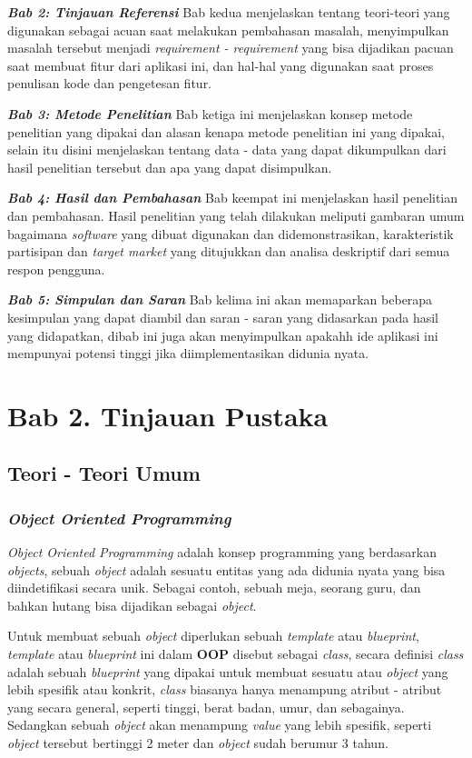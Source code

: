 \documentclass[a4paper]{article}
\newcommand{\bab}[1]{%
    \addtocounter{section}{1}%
    \setcounter{subsection}{0}
    \setcounter{subsubsection}{0}
    \setcounter{figure}{0}
    \setcounter{table}{0}
    \section*{#1}%
    \addcontentsline{toc}{section}{\protect\numberline{}#1}%
}
\newcommand{\subbab}[1]{%
    \subsection{#1}%
    \setcounter{figure}{0}
    \setcounter{table}{0}
}
\newcommand{\subsubbab}[1]{%
    \subsubsection{#1}%
}
\begin{document}
\textit{\textbf{Bab 2: Tinjauan Referensi}}\newline
Bab kedua menjelaskan tentang teori-teori yang digunakan sebagai acuan saat melakukan pembahasan masalah, menyimpulkan masalah tersebut menjadi \textit{requirement - requirement} yang bisa dijadikan pacuan saat membuat fitur dari aplikasi ini, dan hal-hal yang digunakan saat proses penulisan kode dan pengetesan fitur.

\textit{\textbf{Bab 3: Metode Penelitian}}\newline
Bab ketiga ini menjelaskan konsep metode penelitian yang dipakai dan alasan kenapa metode penelitian ini yang dipakai, selain itu disini menjelaskan tentang data - data yang dapat dikumpulkan dari hasil penelitian tersebut dan apa yang dapat disimpulkan.

\textit{\textbf{Bab 4: Hasil dan Pembahasan}}\newline
Bab keempat ini menjelaskan hasil penelitian dan pembahasan. Hasil penelitian yang telah dilakukan meliputi gambaran umum bagaimana \textit{software} yang dibuat digunakan dan didemonstrasikan, karakteristik partisipan dan \textit{target market} yang ditujukkan dan analisa deskriptif dari semua respon pengguna.

\textit{\textbf{Bab 5: Simpulan dan Saran}}\newline
Bab kelima ini akan memaparkan beberapa kesimpulan yang dapat diambil dan saran - saran yang didasarkan pada hasil yang didapatkan, dibab ini juga akan menyimpulkan apakahh ide aplikasi ini mempunyai potensi tinggi jika diimplementasikan didunia nyata.

\newpage
\bab{Bab 2. Tinjauan Pustaka}


\subbab{Teori - Teori Umum}

\subsubbab{\textit{Object Oriented Programming}}
\textit{Object Oriented Programming} adalah konsep programming yang berdasarkan \textit{objects}, sebuah \textit{object} adalah sesuatu entitas yang ada didunia nyata yang bisa diindetifikasi secara unik\autocite{liang_liang_2021}. Sebagai contoh, sebuah meja, seorang guru, dan bahkan hutang bisa dijadikan sebagai \textit{object}.

Untuk membuat sebuah \textit{object} diperlukan sebuah \textit{template} atau \textit{blueprint}, \textit{template} atau \textit{blueprint} ini dalam \textbf{OOP} disebut sebagai \textit{class}, secara definisi \textit{class} adalah sebuah \textit{blueprint} yang dipakai untuk membuat sesuatu atau \textit{object} yang lebih spesifik atau konkrit\autocite{education-erin-oop-2020}, \textit{class} biasanya hanya menampung atribut - atribut yang secara general, seperti tinggi, berat badan, umur, dan sebagainya. Sedangkan sebuah \textit{object} akan menampung \textit{value} yang lebih spesifik, seperti \textit{object} tersebut bertinggi 2 meter dan \textit{object} sudah berumur 3 tahun.
\end{document}
